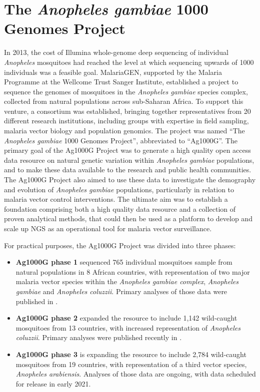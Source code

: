 \documentclass[a4paper,11pt,abstracton,hidelinks]{scrartcl}
\begin{document}
\section{The \textit{Anopheles gambiae} 1000 Genomes Project}


In 2013, the cost of Illumina whole-genome deep sequencing of individual \textit{Anopheles} mosquitoes had reached the level at which sequencing upwards of 1000 individuals was a feasible goal.
%
MalariaGEN, supported by the Malaria Programme at the Wellcome Trust Sanger Institute, established a project to sequence the genomes of mosquitoes in the \textit{Anopheles gambiae} species complex, collected from natural populations across sub-Saharan Africa.
%
To support this venture, a consortium was established, bringing together representatives from 20 different research institutions, including groups with expertise in field sampling, malaria vector biology and population genomics.
%
The project was named ``The \textit{Anopheles gambiae} 1000 Genomes Project'', abbreviated to ``Ag1000G''.
%
The primary goal of the Ag1000G Project was to generate a high quality open access data resource on natural genetic variation within \textit{Anopheles gambiae} populations, and to make these data available to the research and public health communities.
%
The Ag1000G Project also aimed to use these data to investigate the demography and evolution of \textit{Anopheles gambiae} populations, particularly in relation to malaria vector control interventions.
%
The ultimate aim was to establish a foundation comprising both a high quality data resource and a collection of proven analytical methods, that could then be used as a platform to develop and scale up NGS as an operational tool for malaria vector surveillance.
%

For practical purposes, the Ag1000G Project was divided into three phases:
%
\begin{itemize}
%
\item \textbf{Ag1000G phase 1} sequenced 765 individual mosquitoes sample from natural populations in 8 African countries, with representation of two major malaria vector species within the \textit{Anopheles gambiae complex}, \textit{Anopheles gambiae} and \textit{Anopheles coluzzii}. Primary analyses of those data were published in \citet{Ag1000G2017}.
%
\item \textbf{Ag1000G phase 2} expanded the resource to include 1,142 wild-caught mosquitoes from 13 countries, with increased representation of \textit{Anopheles coluzzii}. Primary analyses were published recently in \citet{Ag1000G2020}.
%
\item \textbf{Ag1000G phase 3} is expanding the resource to include 2,784 wild-caught mosquitoes from 19 countries, with representation of a third vector species, \textit{Anopheles arabiensis}. Analyses of those data are ongoing, with data scheduled for release in early 2021.
%
\end{itemize}
\end{document}

